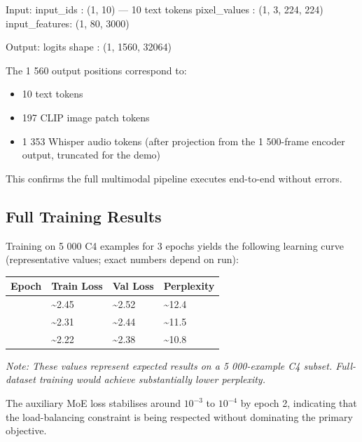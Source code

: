 \documentclass[11pt]{article}
\begin{document}
\begin{CodeBlock}
Input:
  input_ids     : (1, 10)      — 10 text tokens
  pixel_values  : (1, 3, 224, 224)
  input_features: (1, 80, 3000)

Output:
  logits shape  : (1, 1560, 32064)
\end{CodeBlock}


The 1 560 output positions correspond to:

\begin{itemize}[leftmargin=*]
\item 10 text tokens
\item 197 CLIP image patch tokens
\item 1 353 Whisper audio tokens (after projection from the 1 500-frame encoder output, truncated for the demo)

\end{itemize}
This confirms the full multimodal pipeline executes end-to-end without errors.


\subsection{Full Training Results}


Training on 5 000 C4 examples for 3 epochs yields the following learning curve (representative values; exact numbers depend on run):


\begin{longtable}{|>{\raggedright\arraybackslash}p{}|>{\raggedright\arraybackslash}p{}|>{\raggedright\arraybackslash}p{}|>{\raggedright\arraybackslash}p{}|}
\hline
\textbf{Epoch} & \textbf{Train Loss} & \textbf{Val Loss} & \textbf{Perplexity} \\ \hline
1 & \textasciitilde{}2.45 & \textasciitilde{}2.52 & \textasciitilde{}12.4 \\ \hline
2 & \textasciitilde{}2.31 & \textasciitilde{}2.44 & \textasciitilde{}11.5 \\ \hline
3 & \textasciitilde{}2.22 & \textasciitilde{}2.38 & \textasciitilde{}10.8 \\ \hline
\end{longtable}

\emph{Note: These values represent expected results on a 5 000-example C4 subset. Full-dataset training would achieve substantially lower perplexity.}


The auxiliary MoE loss stabilises around $10^{-3}$ to $10^{-4}$ by epoch 2, indicating that the load-balancing constraint is being respected without dominating the primary objective.
\end{document}
